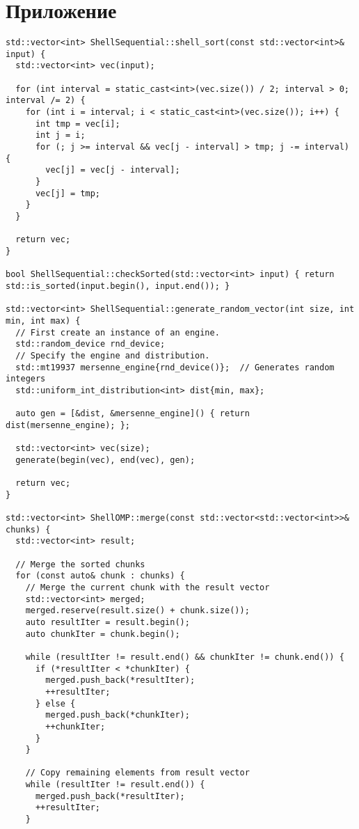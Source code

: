 \documentclass[]{article}
\theoremstyle{remark}
\theoremstyle{definition}
\begin{document}
\newpage

\section{Приложение}

\begin{verbatim}
std::vector<int> ShellSequential::shell_sort(const std::vector<int>& input) {
  std::vector<int> vec(input);

  for (int interval = static_cast<int>(vec.size()) / 2; interval > 0; interval /= 2) {
    for (int i = interval; i < static_cast<int>(vec.size()); i++) {
      int tmp = vec[i];
      int j = i;
      for (; j >= interval && vec[j - interval] > tmp; j -= interval) {
        vec[j] = vec[j - interval];
      }
      vec[j] = tmp;
    }
  }

  return vec;
}

bool ShellSequential::checkSorted(std::vector<int> input) { return std::is_sorted(input.begin(), input.end()); }

std::vector<int> ShellSequential::generate_random_vector(int size, int min, int max) {
  // First create an instance of an engine.
  std::random_device rnd_device;
  // Specify the engine and distribution.
  std::mt19937 mersenne_engine{rnd_device()};  // Generates random integers
  std::uniform_int_distribution<int> dist{min, max};

  auto gen = [&dist, &mersenne_engine]() { return dist(mersenne_engine); };

  std::vector<int> vec(size);
  generate(begin(vec), end(vec), gen);

  return vec;
}

std::vector<int> ShellOMP::merge(const std::vector<std::vector<int>>& chunks) {
  std::vector<int> result;

  // Merge the sorted chunks
  for (const auto& chunk : chunks) {
    // Merge the current chunk with the result vector
    std::vector<int> merged;
    merged.reserve(result.size() + chunk.size());
    auto resultIter = result.begin();
    auto chunkIter = chunk.begin();

    while (resultIter != result.end() && chunkIter != chunk.end()) {
      if (*resultIter < *chunkIter) {
        merged.push_back(*resultIter);
        ++resultIter;
      } else {
        merged.push_back(*chunkIter);
        ++chunkIter;
      }
    }

    // Copy remaining elements from result vector
    while (resultIter != result.end()) {
      merged.push_back(*resultIter);
      ++resultIter;
    }


\end{verbatim}
\end{document}
